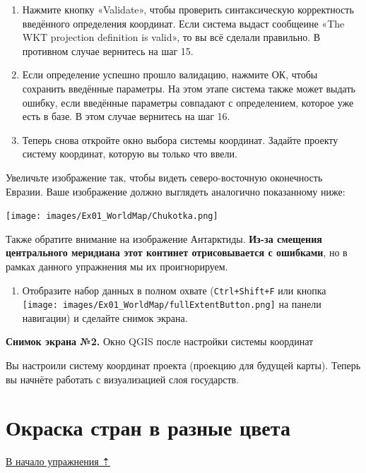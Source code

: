 \documentclass[
  12pt,
]{book}
\providecommand{\tightlist}{%
  \setlength{\itemsep}{0pt}\setlength{\parskip}{0pt}}
\begin{document}
\begin{enumerate}
\def\labelenumi{\arabic{enumi}.}
\setcounter{enumi}{16}
\item
  Нажмите кнопку «Validate», чтобы проверить синтаксическую корректность введённого определения координат. Если система выдаст сообщеине «The WKT projection definition is valid», то вы всё сделали правильно. В противном случае вернитесь на шаг 15.
\item
  Если определение успешно прошло валидацию, нажмите ОК, чтобы сохранить введённые параметры. На этом этапе система также может выдать ошибку, если введённые параметры совпадают с определением, которое уже есть в базе. В этом случае вернитесь на шаг 16.
\item
  Теперь снова откройте окно выбора системы координат. Задайте проекту систему координат, которую вы только что ввели.
\end{enumerate}

Увеличьте изображение так, чтобы видеть северо-восточную оконечность Евразии. Ваше изображение должно выглядеть аналогично показанному ниже:

\texttt{[image: images/Ex01\_WorldMap/Chukotka.png]}

Также обратите внимание на изображение Антарктиды. \textbf{Из-за смещения центрального меридиана этот континет отрисовывается с ошибками}, но в рамках данного упражнения мы их проигнорируем.

\begin{enumerate}
\def\labelenumi{\arabic{enumi}.}
\setcounter{enumi}{19}
\tightlist
\item
  Отобразите набор данных в полном охвате (\texttt{Ctrl+Shift+F} или кнопка \texttt{[image: images/Ex01\_WorldMap/fullExtentButton.png]} на панели навигации) и сделайте снимок экрана.
\end{enumerate}

\textbf{Снимок экрана №2.} Окно QGIS после настройки системы координат

Вы настроили систему координат проекта (проекцию для будущей карты). Теперь вы начнёте работать с визуализацией слоя государств.

\hypertarget{map-design-world-colorbrewer}{%
\section{Окраска стран в разные цвета}\label{map-design-world-colorbrewer}}

\protect\hyperlink{map-design-world}{В начало упражнения ⇡}
\end{document}

